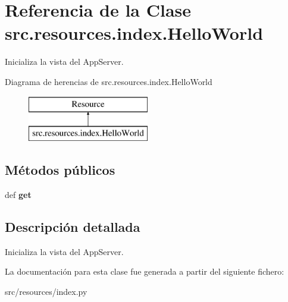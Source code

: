 \hypertarget{classsrc_1_1resources_1_1index_1_1_hello_world}{\section{Referencia de la Clase src.\-resources.\-index.\-Hello\-World}
\label{classsrc_1_1resources_1_1index_1_1_hello_world}
}


Inicializa la vista del App\-Server.  


Diagrama de herencias de src.\-resources.\-index.\-Hello\-World\begin{figure}[H]
\begin{center}
\leavevmode
\includegraphics[height=2.000000cm]{classsrc_1_1resources_1_1index_1_1_hello_world}
\end{center}
\end{figure}
\subsection*{Métodos públicos}
\begin{DoxyCompactItemize}
\item 
\hypertarget{classsrc_1_1resources_1_1index_1_1_hello_world_a35cae5cb28b3d64bf1e74089fc6b2930}{def {\bfseries get}}\label{classsrc_1_1resources_1_1index_1_1_hello_world_a35cae5cb28b3d64bf1e74089fc6b2930}

\end{DoxyCompactItemize}


\subsection{Descripción detallada}
Inicializa la vista del App\-Server. 

La documentación para esta clase fue generada a partir del siguiente fichero\-:\begin{DoxyCompactItemize}
\item 
src/resources/index.\-py\end{DoxyCompactItemize}

